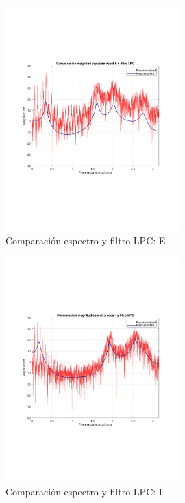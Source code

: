 	\begin{figure}[H]
		\center
		\includegraphics[width=0.6\textwidth,clip, trim = {1.9cm 6.8cm 2.3cm 7cm}]{../plots/E_lpc.pdf}
		\caption{Comparación espectro y filtro LPC: E}
		\label{fig:LPC_E}
	\end{figure}

	\begin{figure}[H]
		\center
		\includegraphics[width=0.6\textwidth,clip, trim = {1.9cm 6.8cm 2.3cm 7cm}]{../plots/I_lpc.pdf}
		\caption{Comparación espectro y filtro LPC: I}
		\label{fig:LPC_I}
	\end{figure}

